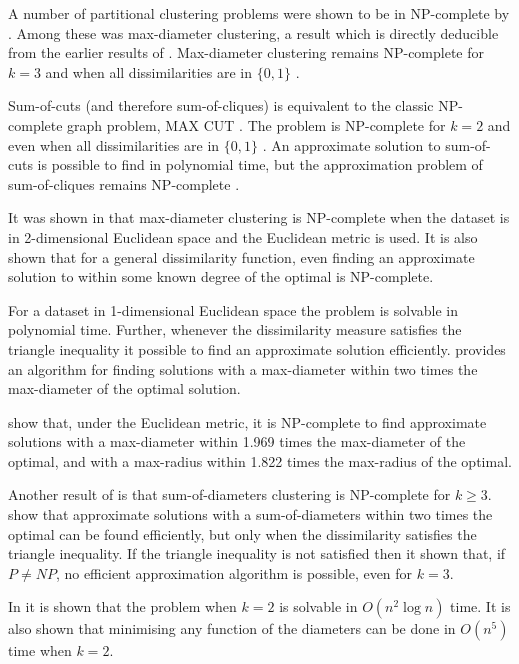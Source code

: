 \documentclass[a4paper]{report}
\begin{document}
A number of partitional clustering problems were shown to be in NP-complete by
\citet{brucker1978complexity}.  Among these was max-diameter clustering, a
result which is directly deducible from the earlier results of
\citet{sahni1976p}.  Max-diameter clustering remains NP-complete for $k=3$ and
when all dissimilarities are in $\{0,1\}$ \citep{gareyjohnson79}.

Sum-of-cuts (and therefore sum-of-cliques) is equivalent to the classic
NP-complete graph problem, MAX CUT
\citep{karp72twentyone,gonzalez1982computational}.  The problem is NP-complete
for $k=2$ and even when all dissimilarities are in $\{0,1\}$
\citep{garey76simplified}.  An approximate solution to sum-of-cuts is possible
to find in polynomial time, but the approximation problem of sum-of-cliques
remains NP-complete \citep{sahni1976p}.

It was shown in \citet{gonzalez1985clustering} that max-diameter clustering is
NP-complete when the dataset is in 2-dimensional Euclidean space and the
Euclidean metric is used.  It is also shown that for a general dissimilarity
function, even finding an approximate solution to within some known degree of
the optimal is NP-complete.

For a dataset in 1-dimensional Euclidean space the problem is solvable in
polynomial time.  Further, whenever the dissimilarity measure satisfies the
triangle inequality it possible to find an approximate solution efficiently.
\citet{brucker1978complexity} provides an algorithm for finding solutions with
a max-diameter within two times the max-diameter of the optimal solution.

\citet{bern1996approximation} show that, under the Euclidean metric, it is
NP-complete to find approximate solutions with a max-diameter within 1.969
times the max-diameter of the optimal, and with a max-radius within 1.822
times the max-radius of the optimal.

Another result of \citet{brucker1978complexity} is that sum-of-diameters
clustering is NP-complete for $k \geq 3$.  \citet{doddi2000approximation} show
that approximate solutions with a sum-of-diameters within two times the
optimal can be found efficiently, but only when the dissimilarity satisfies
the triangle inequality.  If the triangle inequality is not satisfied then it
shown that, if $P \neq NP$, no efficient approximation algorithm is possible,
even for $k=3$.

In \citet{hansen87sumofdiameters} it is shown that the problem when $k=2$ is
solvable in $O(n^2 \log n)$ time.  It is also shown that minimising any
function of the diameters can be done in $O(n^5)$ time when $k=2$.
\end{document}

